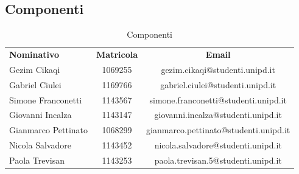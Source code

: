 \subsection{Componenti}
\begin{longtable}{|p{5cm}|c|c|}
	\arrayrulecolor{white}
	\caption{Componenti} \\
	\hline
	\rowcolor{header}
	\textbf{Nominativo} & \textbf{Matricola} & \textbf{Email}
	\tabularnewline
	\endfirsthead
	\hline
	Gezim Cikaqi & 1069255 & gezim.cikaqi@studenti.unipd.it \\
	Gabriel Ciulei & 1169766 & gabriel.ciulei@studenti.unipd.it\\
	Simone Franconetti & 1143567 & simone.franconetti@studenti.unipd.it\\
	Giovanni Incalza & 1143147 & giovanni.incalza@studenti.unipd.it\\
	Gianmarco Pettinato & 1068299 & gianmarco.pettinato@studenti.unipd.it\\
	Nicola Salvadore & 1143452 & nicola.salvadore@studenti.unipd.it\\
	Paola Trevisan & 1143253 & paola.trevisan.5@studenti.unipd.it\\
	\hline
\end{longtable}